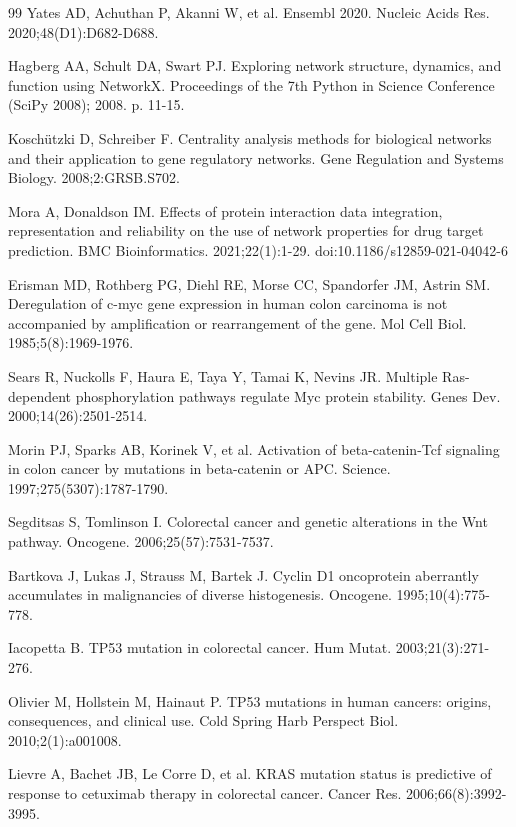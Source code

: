 \documentclass[11pt]{article}
\begin{document}
\begin{thebibliography}{99}
Yates AD, Achuthan P, Akanni W, et al. Ensembl 2020. Nucleic Acids Res. 2020;48(D1):D682-D688.

Hagberg AA, Schult DA, Swart PJ. Exploring network structure, dynamics, and function using NetworkX. Proceedings of the 7th Python in Science Conference (SciPy 2008); 2008. p. 11-15.

Koschützki D, Schreiber F. Centrality analysis methods for biological networks and their application to gene regulatory networks. Gene Regulation and Systems Biology. 2008;2:GRSB.S702.

Mora A, Donaldson IM. Effects of protein interaction data integration, representation and reliability on the use of network properties for drug target prediction. BMC Bioinformatics. 2021;22(1):1-29. doi:10.1186/s12859-021-04042-6

Erisman MD, Rothberg PG, Diehl RE, Morse CC, Spandorfer JM, Astrin SM. Deregulation of c-myc gene expression in human colon carcinoma is not accompanied by amplification or rearrangement of the gene. Mol Cell Biol. 1985;5(8):1969-1976.

Sears R, Nuckolls F, Haura E, Taya Y, Tamai K, Nevins JR. Multiple Ras-dependent phosphorylation pathways regulate Myc protein stability. Genes Dev. 2000;14(26):2501-2514.

Morin PJ, Sparks AB, Korinek V, et al. Activation of beta-catenin-Tcf signaling in colon cancer by mutations in beta-catenin or APC. Science. 1997;275(5307):1787-1790.

Segditsas S, Tomlinson I. Colorectal cancer and genetic alterations in the Wnt pathway. Oncogene. 2006;25(57):7531-7537.

Bartkova J, Lukas J, Strauss M, Bartek J. Cyclin D1 oncoprotein aberrantly accumulates in malignancies of diverse histogenesis. Oncogene. 1995;10(4):775-778.

Iacopetta B. TP53 mutation in colorectal cancer. Hum Mutat. 2003;21(3):271-276.

Olivier M, Hollstein M, Hainaut P. TP53 mutations in human cancers: origins, consequences, and clinical use. Cold Spring Harb Perspect Biol. 2010;2(1):a001008.

Lievre A, Bachet JB, Le Corre D, et al. KRAS mutation status is predictive of response to cetuximab therapy in colorectal cancer. Cancer Res. 2006;66(8):3992-3995.


\end{thebibliography}
\end{document}
